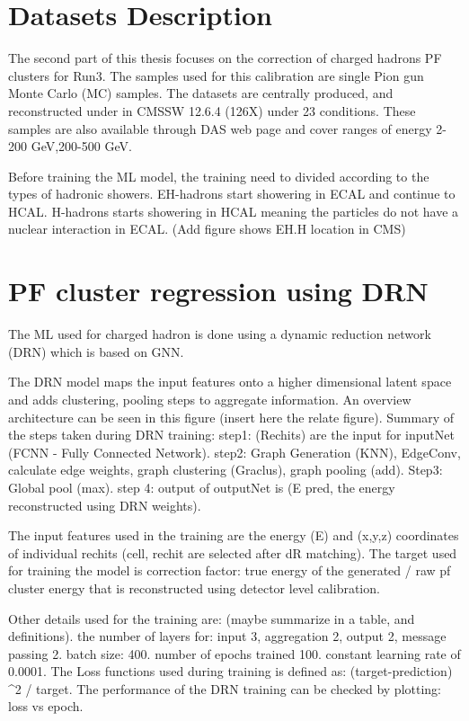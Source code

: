 \section{Datasets Description}
The second part of this thesis focuses on the correction of charged hadrons PF clusters for Run3. The samples used for this calibration are single Pion gun Monte Carlo (MC) samples. The datasets are centrally produced, and reconstructed under in CMSSW 12.6.4 (126X) under 23 conditions. These samples are also available through DAS web page and cover ranges of energy 2-200 GeV,200-500 GeV.

Before training the ML model, the training need to divided according to the types of hadronic showers. EH-hadrons start showering in ECAL and continue to HCAL. H-hadrons starts showering in HCAL meaning the particles do not have a nuclear interaction in ECAL. (Add figure shows EH.H location in CMS)

\section{PF cluster regression using DRN}
The ML used for charged hadron is done using a dynamic reduction network (DRN) which is based on GNN. %

The DRN model maps the input features onto a higher dimensional latent space and adds clustering, pooling steps to aggregate information. An overview architecture can be seen in this figure (insert here the relate figure). Summary of the steps taken during DRN training: 
step1: (Rechits) are the input for inputNet (FCNN - Fully Connected Network). 
step2: Graph Generation (KNN), EdgeConv, calculate edge weights, graph clustering (Graclus), graph pooling (add). 
Step3: Global pool (max).  
step 4: output of outputNet is (E pred, the energy reconstructed using DRN weights).

The input features used in the training are the energy (E) and (x,y,z) coordinates of individual rechits (cell, rechit are selected after dR matching). The target used for training the model is correction factor:  true energy of the generated / raw pf cluster energy that is reconstructed using detector level calibration.

Other details used for the training are:  (maybe summarize in a table, and definitions).  
the number of layers for: input 3, aggregation 2, output 2, message passing 2.  
batch size: 400. 
number of epochs trained 100. 
constant learning rate of 0.0001.  
The Loss functions used during training is defined as: (target-prediction) ^2 / target.  
The performance of the DRN training can be checked by plotting: loss vs epoch.

